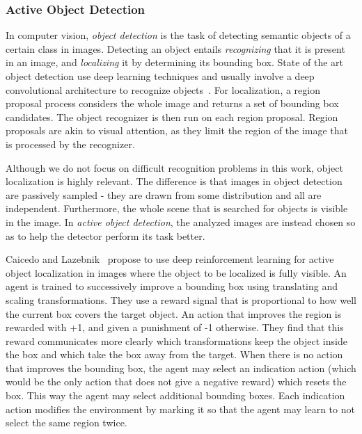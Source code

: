 \subsubsection{Active Object Detection}

In computer vision, \textit{object detection} is the task of detecting semantic objects of a certain class in images.
Detecting an object entails \textit{recognizing} that it is present in an image, and \textit{localizing} it by determining its bounding box.
State of the art object detection use deep learning techniques and usually involve a deep convolutional architecture to recognize objects~\cite{zhao_objectdetection_2019}.
For localization, a region proposal process considers the whole image and returns a set of bounding box candidates.
The object recognizer is then run on each region proposal.
Region proposals are akin to visual attention, as they limit the region of the image that is processed by the recognizer.

Although we do not focus on difficult recognition problems in this work, object localization is highly relevant.
The difference is that images in object detection are passively sampled - they are drawn from some distribution and all are independent.
Furthermore, the whole scene that is searched for objects is visible in the image.
In \textit{active object detection}, the analyzed images are instead chosen so as to help the detector perform its task better.

Caicedo and Lazebnik~\cite{caicedo_active_2015} propose to use deep reinforcement learning for active object localization in images where the object to be localized is fully visible.
An agent is trained to successively improve a bounding box using translating and scaling transformations.
They use a reward signal that is proportional to how well the current box covers the target object.
An action that improves the region is rewarded with +1, and given a punishment of -1 otherwise.
They find that this reward communicates more clearly which transformations keep the object inside the box and which take the box away from the target.
When there is no action that improves the bounding box, the agent may select an indication action (which would be the only action that does not give a negative reward) which resets the box.
This way the agent may select additional bounding boxes.
Each indication action modifies the environment by marking it so that the agent may learn to not select the same region twice.

